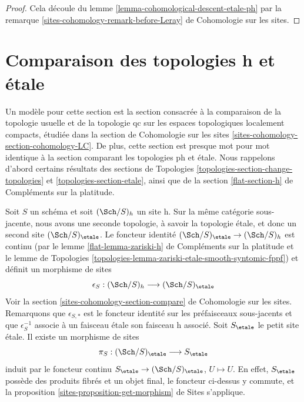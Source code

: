 \begin{proof}
Cela découle du lemme \ref{lemma-cohomological-descent-etale-ph}
par la remarque \ref{sites-cohomology-remark-before-Leray} de Cohomologie sur les sites.
\end{proof}












\section{Comparaison des topologies h et étale}
\label{section-h-etale}

\noindent
Un modèle pour cette section est la section consacrée à la comparaison de la
topologie usuelle et de la topologie qc sur les espaces topologiques
localement compacts, étudiée dans la section de Cohomologie sur les sites
\ref{sites-cohomology-section-cohomology-LC}.
De plus, cette section est presque mot pour mot identique à la
section comparant les topologies ph et étale.
Nous rappelons d'abord certains résultats des
sections de Topologies
\ref{topologies-section-change-topologies} et
\ref{topologies-section-etale}, ainsi que de la
section \ref{flat-section-h} de Compléments sur la platitude.

\medskip\noindent
Soit $S$ un schéma et soit $(\Sch/S)_h$ un site h.
Sur la même catégorie sous-jacente, nous avons une seconde topologie,
à savoir la topologie étale, et donc un second site
$(\Sch/S)_\etale$. Le foncteur identité
$(\Sch/S)_\etale \to (\Sch/S)_h$ est continu
(par le lemme \ref{flat-lemma-zariski-h} de Compléments sur la platitude
et le lemme de Topologies
\ref{topologies-lemma-zariski-etale-smooth-syntomic-fppf})
et définit un morphisme de sites
$$
\epsilon_S : (\Sch/S)_h \longrightarrow (\Sch/S)_\etale
$$
Voir la section \ref{sites-cohomology-section-compare} de Cohomologie sur les sites.
Remarquons que $\epsilon_{S, *}$ est le foncteur identité sur les
préfaisceaux sous-jacents et que $\epsilon_S^{-1}$ associe à un faisceau étale son
faisceau h associé. Soit $S_\etale$ le petit site étale.
Il existe un morphisme de sites
$$
\pi_S : (\Sch/S)_\etale \longrightarrow S_\etale
$$
induit par le foncteur continu
$S_\etale \to (\Sch/S)_\etale$, $U \mapsto U$.
En effet, $S_\etale$ possède des produits fibrés et un objet final, le
foncteur ci-dessus y commute, et la
proposition \ref{sites-proposition-get-morphism} de Sites s'applique.

